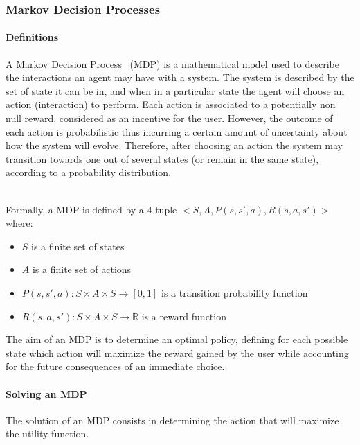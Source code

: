 \subsubsection{Markov Decision Processes}

\paragraph{Definitions}
A Markov Decision Process~\cite{bellman1957} (MDP) is a mathematical model used to describe the interactions  an agent may have with a system.
The system is described by the set of state it can be in, and when in a particular state the agent will choose an action (interaction) to perform.
Each action is associated to a potentially non null reward, considered as an incentive for the user.
However, the outcome of each action is probabilistic thus incurring a certain amount of uncertainty about how the system will evolve.
Therefore, after choosing an action the system may transition towards one out of several states (or remain in the same state), according to a probability distribution.



\textbf{\\}
Formally, a MDP is defined by a 4-tuple $<S,A,P(s,s',a),R(s,a,s')>$ where:
\begin{itemize}
    \item $S$ is a finite set of states
    \item $A$ is a finite set of actions
    \item $P(s,s',a) : S \times A \times S \longrightarrow [0,1]$ is a transition probability function
    \item $R(s,a,s') : S \times A \times S \longrightarrow \mathbb{R}$ is a reward function
\end{itemize}

The aim of an MDP is to determine an optimal policy, defining for each possible state which action will maximize the reward gained by the user while accounting for the future consequences of an immediate choice.


\paragraph{Solving an MDP}
The solution of an MDP consists in determining the action that will maximize the utility function.

